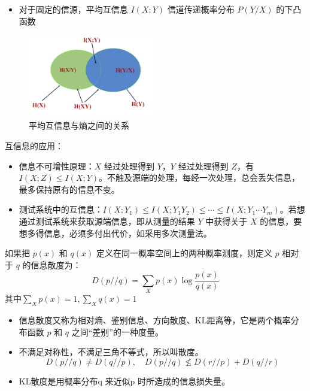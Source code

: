 \begin{remark}
\begin{itemize}
        \item 对于固定的信源，平均互信息 $I(X; Y)$ 信道传递概率分布 $P(Y / X)$ 的下凸
        函数
    \end{itemize}
    \begin{figure}[htbp]
        \centering
        \includegraphics[width=0.5\textwidth]{./figure/fig2.png}
        \caption{平均互信息与熵之间的关系}
    \end{figure}
\end{remark}

\begin{remark}
    互信息的应用：
    \begin{itemize}
        \item 信息不可增性原理：$X$ 经过处理得到 $Y$，$Y$ 经过处理得到 $Z$，有 $I(X; Z) \le I(X; Y)$。不触及源端的处理，每经一次处理，总会丢失信息，最多保持原有的信息不变。
        \item 测试系统中的互信息：$I(X; Y_1) \le I(X; Y_1Y_2) \le \cdots \le I(X; Y_1\cdots Y_m)$。若想通过测试系统来获取源端信息，即从测量的结果 $Y$ 中获得关于 $X$ 的信息，要想多得信息，必须多付出代价，如采用多次测量法。
    \end{itemize}
\end{remark}

\begin{remark}
    如果把 $p(x)$ 和 $q(x)$ 定义在同一概率空间上的两种概率测度，则定义 $p$ 相对于 $q$ 的信息散度为：\[D(p//q) = \sum_Xp(x)\log\frac{p(x)}{q(x)}\]其中$\underset{X}{\sum}p(x) = 1, \underset{X}{\sum}q(x) = 1$
    \begin{itemize}
        \item 信息散度又称为相对熵、鉴别信息、方向散度、KL距离等，它是两个概率分布函数 $p$ 和 $q$ 之间“差别”的一种度量。
        \item 不满足对称性，不满足三角不等式，所以叫散度。\[D(p//q) \neq D(q//p), \quad D(p//q) \nleq D(r//p) + D(q//r)\]
        \item KL散度是用概率分布q 来近似p 时所造成的信息损失量。
    \end{itemize}
\end{remark}

